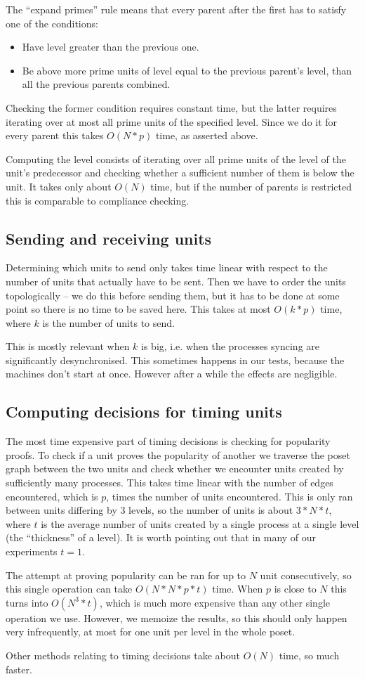 \documentclass[a4paper,10pt]{article}
\begin{document}
			The ``expand primes'' rule means that every parent after the first has to satisfy one of the conditions:
			\begin{itemize}
				\item Have level greater than the previous one.
				\item Be above more prime units of level equal to the previous parent's level, than all the previous parents combined.
			\end{itemize}
			Checking the former condition requires constant time, but the latter requires iterating over at most all prime units of the specified level.
			Since we do it for every parent this takes $O(N*p)$ time, as asserted above.

			Computing the level consists of iterating over all prime units of the level of the unit's predecessor and checking whether a sufficient number of them is below the unit.
			It takes only about $O(N)$ time, but if the number of parents is restricted this is comparable to compliance checking.
		\subsection{Sending and receiving units}
		 Determining which units to send only takes time linear with respect to the number of units that actually have to be sent.
			Then we have to order the units topologically -- we do this before sending them, but it has to be done at some point so there is no time to be saved here.
			This takes at most $O(k*p)$ time, where $k$ is the number of units to send.

			This is mostly relevant when $k$ is big, i.e. when the processes syncing are significantly desynchronised.
			This sometimes happens in our tests, because the machines don't start at once.
			However after a while the effects are negligible.
		\subsection{Computing decisions for timing units}
		 The most time expensive part of timing decisions is checking for popularity proofs.
			To check if a unit proves the popularity of another we traverse the poset graph between the two units and check whether
			we encounter units created by sufficiently many processes. This takes time linear with the number of edges encountered,
			which is $p$, times the number of units encountered. This is only ran between units differing by $3$ levels, so the number of units
			is about $3*N*t$, where $t$ is the average number of units created by a single process at a single level (the ``thickness'' of a level).
			It is worth pointing out that in many of our experiments	$t = 1$.

			The attempt at proving popularity can be ran for up to $N$ unit consecutively, so this single operation can take $O(N*N*p*t)$ time.
			When $p$ is close to $N$ this turns into $O(N^3*t)$, which is much more expensive than any other single operation we use.
			However, we memoize the results, so this should only happen very infrequently, at most for one unit per level in the whole poset.

			Other methods relating to timing decisions take about $O(N)$ time, so much faster.
\end{document}
